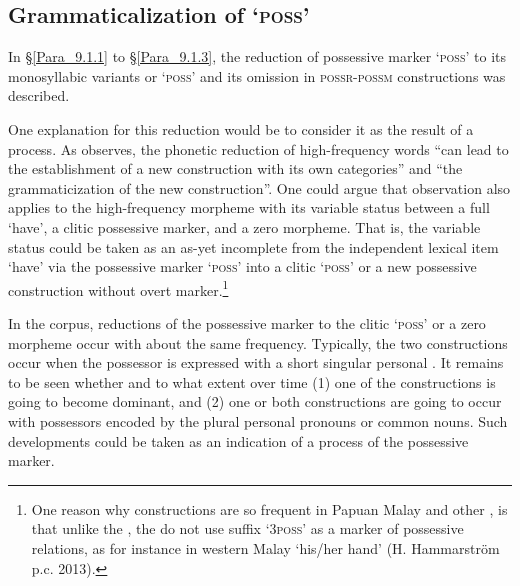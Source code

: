 \subsection{Grammaticalization of  ‘\textsc{poss}’}
\label{Para_9.1.4}
In §\ref{Para_9.1.1} to §\ref{Para_9.1.3}, the reduction of possessive marker  ‘\textsc{poss}’ to its monosyllabic variants  or  ‘\textsc{poss}’ and its omission in \textsc{possr-possm} constructions was described.



One explanation for this reduction would be to consider it as the result of a  process. As \citet[719]{Bybee.2006} observes, the phonetic reduction of high-frequency words “can lead to the establishment of a new construction with its own categories” and “the grammaticization of the new construction”. One could argue that  observation also applies to the high-frequency morpheme  with its variable status between a full  ‘have’, a clitic possessive marker, and a zero morpheme. That is, the variable status could be taken as an as-yet incomplete  from the independent lexical item  ‘have’ via the possessive marker  ‘\textsc{poss}’ into a clitic  ‘\textsc{poss}’ or a new possessive construction without overt marker.\footnote{One reason why  constructions are so frequent in Papuan Malay and other , is that unlike the , the  do not use suffix  ‘\textsc{3poss}’ as a marker of possessive relations, as for instance in western Malay  ‘his/her hand’ (H. Hammarström p.c. 2013).}



In the corpus, reductions of the possessive marker to the clitic  ‘\textsc{poss}’ or a zero morpheme occur with about the same frequency. Typically, the two constructions occur when the possessor is expressed with a short singular personal . It remains to be seen whether and to what extent over time (1) one of the constructions is going to become dominant, and (2) one or both constructions are going to occur with possessors encoded by the plural personal pronouns or common nouns. Such developments could be taken as an indication of a  process of the possessive marker.


